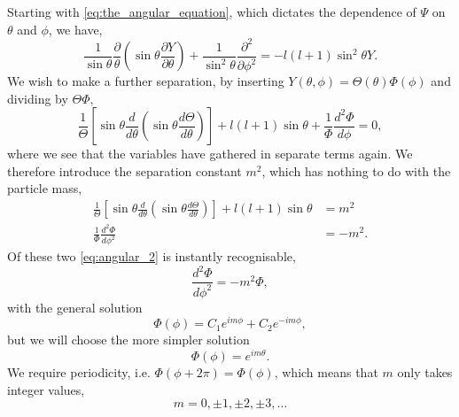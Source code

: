 Starting with \autoref{eq:the_angular_equation}, which dictates the dependence of
$\Psi$ on $\theta$ and $\phi$, we have, 
\begin{equation}
    \frac{1}{\sin\theta}\frac{\partial}{\theta} 
        \left(\sin\theta\frac{\partial Y}{\partial \theta} \right)
    +
    \frac{1}{\sin^2\theta} \frac{\partial^2}{\partial\phi^2}
    =
    -l(l + 1)\sin^2\theta Y.
\end{equation}
We wish to make a further separation, by inserting
$Y(\theta, \phi) = \Theta(\theta)\Phi(\phi)$ and dividing by $\Theta\Phi$,
\begin{equation}
    \frac{1}{\Theta}
    \left[
        \sin\theta \frac{d}{d\theta}
            \left(\sin\theta \frac{d\Theta}{d\theta} \right)
    \right]
    + l(l + 1) \sin\theta 
    +
    \frac{1}{\Phi} \frac{d^2\Phi}{d\phi} = 0,
\end{equation}
where we see that the variables have gathered in separate terms again. We therefore 
introduce the separation constant $m^2$, which has nothing to do with the particle mass,
\begin{align}
    \label{eq:angular_1}
    \frac{1}{\Theta}
    \left[
        \sin\theta \frac{d}{d\theta}
            \left(\sin\theta \frac{d\Theta}{d\theta} \right)
    \right]
    + l(l + 1)\sin\theta &= m^2 \\
    \label{eq:angular_2}
    \frac{1}{\Phi}\frac{d^2\Phi}{d\phi^2} &= -m^2.
\end{align}
Of these two \autoref{eq:angular_2} is instantly recognisable,
\begin{equation}
    \frac{d^2\Phi}{d\phi^2} = -m^2\Phi,
\end{equation}
with the general solution
\begin{equation}
    \Phi(\phi) = C_1e^{im\phi} + C_2 e^{-im\phi},
\end{equation}
but we will choose the more simpler solution 
\begin{equation}
    \Phi(\phi) = e^{im\theta}.
\end{equation}
We require periodicity, i.e. $\Phi(\phi + 2\pi) = \Phi(\phi)$, which means that 
$m$ only takes integer values,
\begin{equation*}
    m = 0, \pm 1, \pm 2, \pm 3, \dots
\end{equation*}

